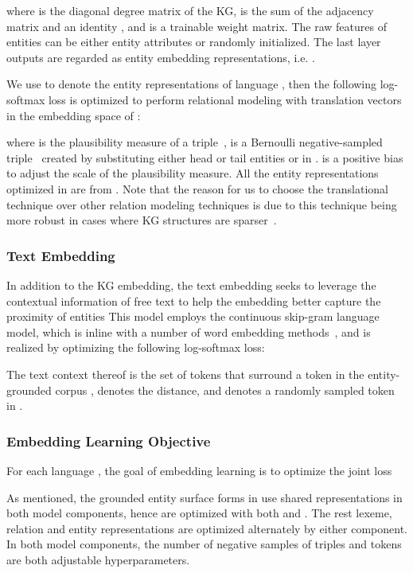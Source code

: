 \documentclass[11pt,a4paper]{article}
\begin{document}
\noindent
where  is the diagonal degree matrix  of the KG,  is the sum of the adjacency matrix  and an identity ,
and  is a trainable weight matrix.
The raw features of entities  can be either entity attributes or randomly initialized.
The last layer outputs are regarded as entity embedding representations, i.e. .

We use  to denote the entity representations of language ,
then the following log-softmax loss is optimized to perform relational modeling with translation vectors in the embedding space of :



\noindent
where  is the plausibility measure of a triple~\cite{bordes2013translating},
 is a Bernoulli negative-sampled triple~\cite{wang2014knowledge} created by substituting either head or tail entities  or  in .
 is a positive bias to adjust the scale of the plausibility measure. 
All the entity representations optimized in  are from .
Note that the reason for us to choose the translational technique over other relation modeling techniques is due to this technique being more robust in cases where KG structures are sparser~\cite{pujara2017sparsity}.

\subsubsection{Text Embedding}

In addition to the KG embedding,
the text embedding seeks to leverage the contextual information of free text to help the embedding better capture the proximity of entities
This model employs the continuous skip-gram language model, which is inline with a number of word embedding methods~\cite{mikolov2013efficient,bojanowski2017enriching,conneau2018word}, and is realized by optimizing the following log-softmax loss:



\noindent
The text context  thereof is the set of tokens that surround a token  in the entity-grounded corpus ,  denotes the  distance, and  denotes a randomly sampled token in .

\subsubsection{Embedding Learning Objective}

For each language , the goal of embedding learning is to optimize the joint loss 

As mentioned, the grounded entity surface forms in  use shared representations in both model components, hence are optimized with both  and .
The rest lexeme, relation and entity representations are optimized alternately by either component.
In both model components, the number of negative samples of triples and tokens are both adjustable hyperparameters.
\end{document}
